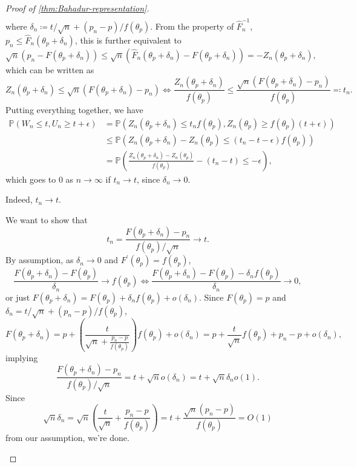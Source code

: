 \begin{proof}[Proof of \autoref{thm:Bahadur-representation}]
\[\begin{split}
		\end{split}
	\]
	where \(\delta _n \coloneqq t / \sqrt{n} + (p_n - p) / f(\theta _p)\). From the property of \(\hat{F} _n ^{-1} \), \(p_n \leq \hat{F} _n(\theta _p + \delta _n)\), this is further equivalent to
	\[
		\sqrt{n} (p_n - F(\theta _p + \delta _n)) \leq \sqrt{n} (\hat{F} _n(\theta _p + \delta _n) - F(\theta _p + \delta _n)) = -Z_n(\theta _p + \delta _n),
	\]
	which can be written as
	\[
		Z_n(\theta _p + \delta _n) \leq \sqrt{n} (F(\theta _p + \delta _n) - p_n)
		\iff  \frac{Z_n(\theta _p + \delta _n)}{f(\theta _p)} \leq \frac{\sqrt{n} (F(\theta _p + \delta _n) - p_n)}{f(\theta _p)} \eqqcolon t_n .
	\]
	Putting everything together, we have
	\[
		\begin{split}
			\mathbb{P} (W_n \leq t, U_n \geq t + \epsilon )
			 & = \mathbb{P} (Z_n(\theta _p + \delta _n) \leq t_n f(\theta _p) , Z_n(\theta _p) \geq f(\theta _p) (t + \epsilon ))        \\
			 & \leq \mathbb{P} (Z_n(\theta _p + \delta _n) - Z_n(\theta _p) \leq (t_n - t - \epsilon ) f(\theta _p))                     \\
			 & = \mathbb{P} \left( \frac{Z_n(\theta _p + \delta _n) - Z_n(\theta _p)}{f(\theta _p)} - (t_n - t) \leq -\epsilon \right) ,
		\end{split}
	\]
	which goes to \(0\) as \(n \to \infty \) if \(t_n \to t\), since \(\delta _n \to 0\).

	\begin{claim}
		Indeed, \(t_n \to t\).
	\end{claim}
	\begin{explanation}
		We want to show that
		\[
			t_n = \frac{F(\theta _p + \delta _n) - p_n}{f(\theta _p) / \sqrt{n} } \to t.
		\]
		By assumption, as \(\delta _n \to 0\) and \(F^{\prime} (\theta _p) = f(\theta _p)\),
		\[
			\frac{F(\theta _p + \delta _n) - F(\theta _p)}{\delta _n} \to f(\theta _p)
			\iff \frac{F(\theta _p + \delta _n) - F(\theta _p) - \delta _n f(\theta _p)}{\delta _n} \to 0,
		\]
		or just \(F(\theta _p + \delta _n) = F(\theta _p) + \delta _n f(\theta _p) + o(\delta _n)\). Since \(F(\theta _p) = p\) and \(\delta _n = t / \sqrt{n} + (p_n - p) / f(\theta _p)\),
		\[
			F(\theta _p + \delta _n)
			= p + \left( \frac{t}{\sqrt{n}  + \frac{p_n - p}{f(\theta _p)}} \right) f(\theta _p) + o(\delta _n)
			= p + \frac{t}{\sqrt{n} } f(\theta _p) + p_n - p + o(\delta _n),
		\]
		implying
		\[
			\frac{F(\theta _p + \delta _n) - p_n}{f(\theta _p) / \sqrt{n} }
			= t + \sqrt{n} o(\delta _n)
			= t + \sqrt{n} \delta _n o(1).
		\]
		Since
		\[
			\sqrt{n} \delta _n
			= \sqrt{n} \left( \frac{t}{\sqrt{n} } + \frac{p_n - p}{f(\theta _p)} \right)
			= t + \frac{\sqrt{n} (p_n - p)}{f(\theta _p)}
			= O(1)
		\]
		from our assumption, we're done.
	\end{explanation}
\end{proof}

